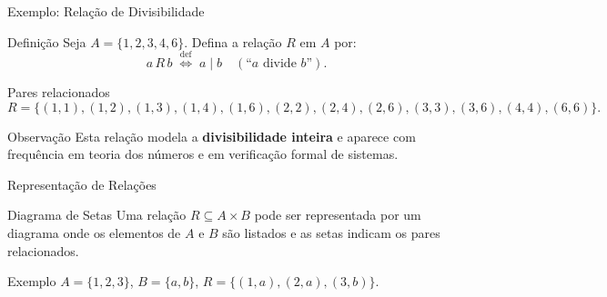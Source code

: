 \documentclass[9pt]{beamer}
\begin{document}
\begin{frame}{Exemplo: Relação de Divisibilidade}

\begin{block}{Definição}
Seja $A = \{1, 2, 3, 4, 6\}$.  
Defina a relação $R$ em $A$ por:
\[
a\,R\,b \;\stackrel{\text{def}}{\Longleftrightarrow}\; a \mid b
\quad (\text{``}a \text{ divide } b\text{''}).
\]
\end{block}

\begin{block}{Pares relacionados}
\[
R = \{(1,1),(1,2),(1,3),(1,4),(1,6),(2,2),(2,4),(2,6),(3,3),(3,6),(4,4),(6,6)\}.
\]
\end{block}

\begin{block}{Observação}
Esta relação modela a \textbf{divisibilidade inteira} e aparece com frequência em teoria dos números e em verificação formal de sistemas.
\end{block}

\end{frame}

\begin{frame}{Representação de Relações}

\begin{block}{Diagrama de Setas}
Uma relação $R \subseteq A \times B$ pode ser representada por um diagrama onde os elementos de $A$ e $B$ são listados e as setas indicam os pares relacionados.
\end{block}

\begin{block}{Exemplo}
$A = \{1,2,3\}$, $B = \{a,b\}$, $R = \{(1,a),(2,a),(3,b)\}$.

\medskip
\centering
{}
\end{block}

\end{frame}
\end{document}
